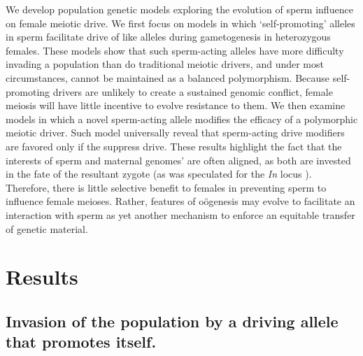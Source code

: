 \documentclass[12pt,letterpaper]{article}
\begin{document}
We develop population genetic models exploring the evolution of sperm influence on female meiotic drive. %
We first focus on models in which `self-promoting' alleles in
  sperm facilitate drive of like alleles during gametogenesis in heterozygous females. 
These models show that such sperm-acting alleles 
	have more difficulty invading a population than do traditional meiotic drivers, 
	 and under most circumstances, cannot be maintained as a balanced polymorphism.
Because self-promoting drivers are unlikely to create a sustained genomic conflict, 
	female meiosis will have little incentive to evolve resistance to them.
We then examine models in which a novel sperm-acting allele modifies the efficacy of a polymorphic meiotic driver. 
Such model universally reveal that sperm-acting drive modifiers are favored only if the suppress drive. 
These results highlight the fact that the interests of sperm and maternal  genomes' are often aligned, as both are invested in the fate of the resultant zygote (as was speculated for the \emph{In} locus \citep{Pomiankowski1993}).
Therefore, there is little selective benefit to females in preventing sperm to influence female meioses.
Rather, features of o\"{o}genesis  may evolve to facilitate an interaction with sperm %
	as yet another mechanism to enforce an equitable transfer of genetic material.

\section*{Results}

\subsection*{ Invasion of the population by a driving allele that promotes itself.}
\end{document}
